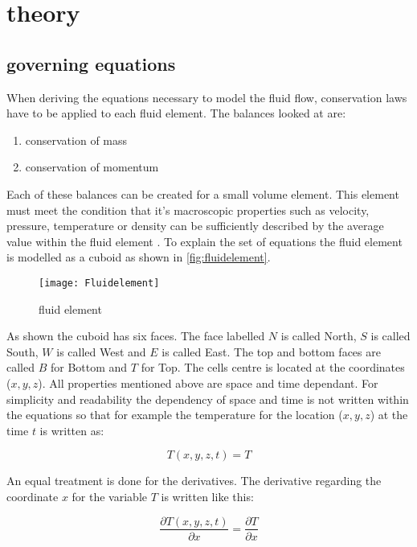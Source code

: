 \documentclass[../thesis.tex]{subfiles}
\begin{document}
\chapter{theory}
\label{chp:theory}


\section{governing equations}

When deriving the equations necessary to model the fluid flow, conservation laws have to be applied to each fluid element. The balances looked at are:
\begin{enumerate}
	\item conservation of mass
	\item conservation of momentum
\end{enumerate}
Each of these balances can be created for a small volume element. This element must meet the condition that it's macroscopic properties such as velocity, pressure, temperature or density can be sufficiently described by the average value within the fluid element \cite{versteeg2007introduction}. To explain the set of equations the fluid element is modelled as a cuboid as shown in \autoref{fig:fluidelement}.

\begin{figure}[htbp]
	\centering
	\texttt{[image: Fluidelement]}
	\caption{fluid element}
	\label{fig:fluidelement}
\end{figure}

As shown the cuboid has six faces. The face labelled $ N $ is called North, $ S $ is called South, $ W $ is called West and $ E $ is called East. The top and bottom faces are called $ B $ for Bottom and $ T $ for Top. The cells centre is located at the coordinates ($ x,y,z $). All properties mentioned above are space and time dependant. For simplicity and readability the dependency of space and time is not written within the equations so that for example the temperature for the location ($ x,y,z $) at the time $ t $ is written as:

\begin{equation}
	T(x,y,z,t) = T
\end{equation}

An equal treatment is done for the derivatives. The derivative regarding the coordinate $ x $ for the variable $ T $ is written like this:

\begin{equation}
	\dfrac{\partial T(x,y,z,t)}{\partial x} = \dfrac{\partial T}{\partial x}
\end{equation}
\end{document}
